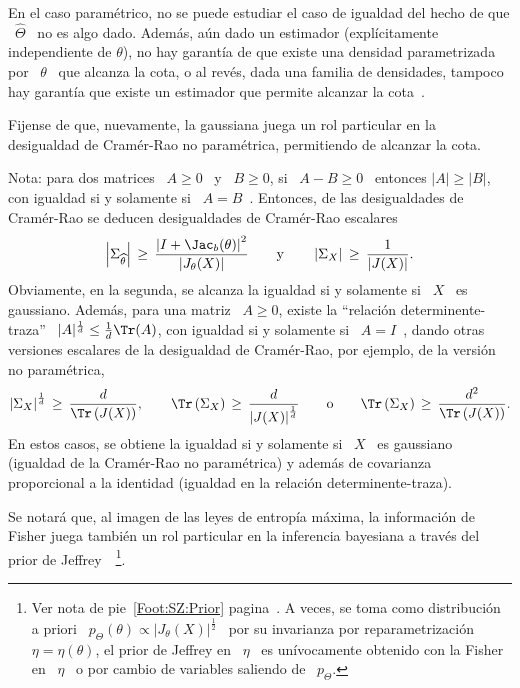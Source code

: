 %
\noindent En el caso param\'etrico, no se puede estudiar el caso de igualdad del
hecho de  que \ $\widehat{\Theta}$ \ no  es algo dado.  Adem\'as,  a\'un dado un
estimador (expl\'icitamente independiente de $\theta$), no hay garant\'ia de que
existe una  densidad parametrizada por  \ $\theta$ \  que alcanza la cota,  o al
rev\'es, dada  una familia de densidades,  tampoco hay garant\'ia  que existe un
estimador que permite alcanzar la cota~\cite{CovTho06, Kay93, Bos07}.

Fijense  de  que,  nuevamente,  la  gaussiana  juega un  rol  particular  en  la
desigualdad de Cram\'er-Rao no param\'etrica, permitiendo de alcanzar la cota.

Nota: para  dos matrices \  $A \ge 0$  \ y \  $B \ge 0$,  si \ $A  - B \ge  0$ \
entonces $|A| \ge  |B|$, con igualdad si y solamente si  \ $A = B$~\cite[cap.~1,
teorema~25]{MagNeu99}.   Entonces,  de  las  desigualdades  de  Cram\'er-Rao  se
deducen desigualdades de Cram\'er-Rao escalares
%
\[
\left|   \Sigma_{\widehat{\theta}}  \right|   \,   \ge  \,   \frac{\left|  I   +
    \Jac_b(\theta) \right|^2}{\left| J_\theta(X) \right|} \qquad \mbox{y} \qquad
\left| \Sigma_X \right| \, \ge \, \frac{1}{\left| J(X) \right|}.
\]
%
Obviamente, en la segunda,  se alcanza la igualdad si y solamente  si \ $X$ \ es
gaussiano.   Adem\'as, para  una  matriz \  $A  \ge 0$,  existe la  ``relaci\'on
determinente-traza''  \ $|A|^{\frac1d} \le  \frac1d \Tr(A)$,  con igualdad  si y
solamente si  \ $A = I$~\cite[cap.~11, sec.~4]{MagNeu99},  dando otras versiones
escalares de  la desigualdad  de Cram\'er-Rao, por  ejemplo, de la  versi\'on no
param\'etrica,
%
\[
\left| \Sigma_X  \right|^{\frac1d} \,  \ge \, \frac{d}{\Tr\left(  J(X) \right)},
\qquad   \Tr\left(   \Sigma_X   \right)   \,   \ge   \,   \frac{d}{\left|   J(X)
  \right|^{\frac1d}} \qquad \mbox{o} \qquad \Tr\left( \Sigma_X \right) \, \ge \,
\frac{d^2}{\Tr\left( J(X) \right)}.
\]
%
En estos casos,  se obtiene la igualdad si  y solamente si \ $X$  \ es gaussiano
(igualdad  de  la  Cram\'er-Rao  no  param\'etrica)  y  adem\'as  de  covarianza
proporcional a la identidad (igualdad en la relaci\'on determinente-traza).

Se notar\'a que, al imagen de las leyes de entrop\'ia m\'axima, la informaci\'on
de  Fisher  juega tambi\'en  un  rol particular  en  la  inferencia bayesiana  a
trav\'es del prior de Jeffrey~\cite{Jef46, Jef48, LehCas98, Rob07}~\footnote{Ver
  nota de  pie~\ref{Foot:SZ:Prior} pagina~\pageref{Foot:SZ:Prior}.  A  veces, se
  toma    como   distribuci\'on   a    priori   \    $p_\Theta(\theta)   \propto
  |J_\theta(X)|^\frac12$ \  por su invarianza por reparametrizaci\'on  \ $\eta =
  \eta(\theta)$,  \ie  el prior  de  Jeffrey en  \  $\eta$  \ es  un\'ivocamente
  obtenido con la Fisher  en \ $\eta$ \ o por cambio  de variables saliendo de \
  $p_\Theta$.}.


